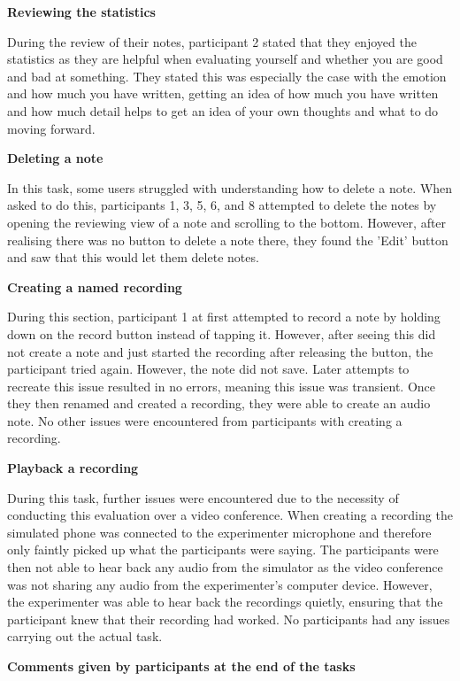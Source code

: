 \documentclass{l4proj}
\begin{document}
\textbf{Reviewing the statistics}

During the review of their notes, participant 2 stated that they enjoyed the statistics as they are helpful when evaluating yourself and whether you are good and bad at something. They stated this was especially the case with the emotion and how much you have written, getting an idea of how much you have written and how much detail helps to get an idea of your own thoughts and what to do moving forward.


\textbf{Deleting a note}
 
In this task, some users struggled with understanding how to delete a note. When asked to do this, participants 1, 3, 5, 6, and 8 attempted to delete the notes by opening the reviewing view of a note and scrolling to the bottom. However, after realising there was no button to delete a note there, they found the 'Edit' button and saw that this would let them delete notes. 

\textbf{Creating a named recording}

During this section, participant 1 at first attempted to record a note by holding down on the record button instead of tapping it. However, after seeing this did not create a note and just started the recording after releasing the button, the participant tried again. However, the note did not save. Later attempts to recreate this issue resulted in no errors, meaning this issue was transient. Once they then renamed and created a recording, they were able to create an audio note. No other issues were encountered from participants with creating a recording.

\textbf{Playback a recording}

During this task, further issues were encountered due to the necessity of conducting this evaluation over a video conference. When creating a recording the simulated phone was connected to the experimenter microphone and therefore only faintly picked up what the participants were saying. The participants were then not able to hear back any audio from the simulator as the video conference was not sharing any audio from the experimenter’s computer device. However, the experimenter was able to hear back the recordings quietly, ensuring that the participant knew that their recording had worked. No participants had any issues carrying out the actual task.


\textbf{Comments given by participants at the end of the tasks}
\end{document}
